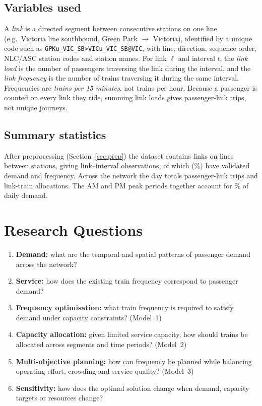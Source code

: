 \documentclass[conference]{IEEEtran}
\begin{document}
\subsection{Variables used}
A \emph{link} is a directed segment between consecutive stations on one line (e.g.\ Victoria line southbound,
Green Park $\rightarrow$ Victoria), identified by a unique code such as \texttt{GPKu\_VIC\_SB>VICu\_VIC\_SB@VIC},
with line, direction, sequence order, NLC/ASC station codes and station names. For link $\ell$ and interval $t$,
the \emph{link load} is the number of passengers traversing the link during the interval, and the \emph{link
frequency} is the number of trains traversing it during the same interval. Frequencies are \emph{trains per
15 minutes}, not trains per hour. Because a passenger is counted on every link they ride, summing link loads gives
passenger-link trips, not unique journeys.

\subsection{Summary statistics}
After preprocessing (Section~\ref{sec:prep}) the dataset contains \NLinks{} links on \NLines{} lines between
\NStations{} stations, giving \NObs{} link--interval observations, of which \NEligService{} (\PctEligService\%) have
validated demand and frequency. Across the network the day totals \NetDailyDemand{} passenger-link trips and
\NetDailyTrains{} link-train allocations. The AM and PM peak periods together account for \PctPeak\% of daily demand.

\section{Research Questions}\label{sec:questions}
\begin{enumerate}
\item[\textbf{Q1}] \textbf{Demand:} what are the temporal and spatial patterns of passenger demand across the network?
\item[\textbf{Q2}] \textbf{Service:} how does the existing train frequency correspond to passenger demand?
\item[\textbf{Q3}] \textbf{Frequency optimisation:} what train frequency is required to satisfy demand under capacity constraints? (Model~1)
\item[\textbf{Q4}] \textbf{Capacity allocation:} given limited service capacity, how should trains be allocated across segments and time periods? (Model~2)
\item[\textbf{Q5}] \textbf{Multi-objective planning:} how can frequency be planned while balancing operating effort, crowding and service quality? (Model~3)
\item[\textbf{Q6}] \textbf{Sensitivity:} how does the optimal solution change when demand, capacity targets or resources change?
\end{enumerate}
\end{document}
